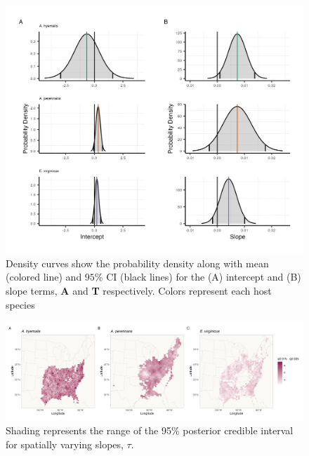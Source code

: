 \documentclass[11pt]{article}
\begin{document}
	
\begin{figure}[H]
	\centering
	\includegraphics[width = \linewidth]{../Plots/posterior_plot.png}
	\caption[Posterior estimates of parameters describing global temporal trends in endophyte prevalence trends.]{Density curves show the probability density along with mean (colored line) and $95$\% CI (black lines) for the (A) intercept and (B) slope terms, \textbf{A} and \textbf{T} respectively. Colors represent each host species}
	\label{fig:temporal_posterior}
\end{figure}


\begin{figure}[H]
	\centering
	\includegraphics[width = \linewidth]{../Plots/svc_time_map_CI.png}
	\caption[Uncertainty in spatially-varying trends representing change in endophyte prevalence for each host species.]{Shading represents the range of the 95\% posterior credible interval for spatially varying slopes, $\tau$.}
	\label{fig:svc_time_map_CI}
\end{figure}
\end{document}
